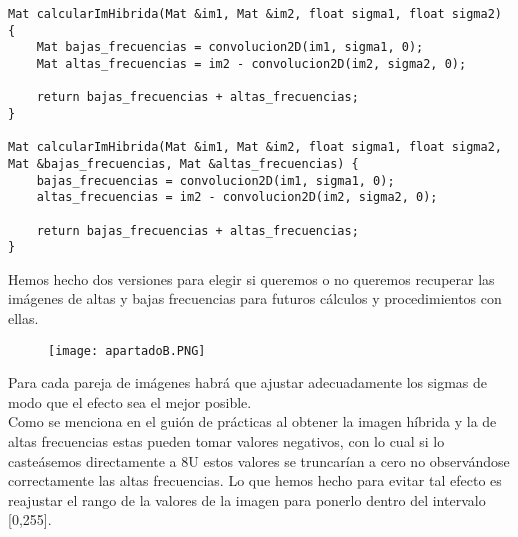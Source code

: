 \documentclass[10pt,a4paper]{article}
\begin{document}
\begin{lstlisting}
Mat calcularImHibrida(Mat &im1, Mat &im2, float sigma1, float sigma2) {
	Mat bajas_frecuencias = convolucion2D(im1, sigma1, 0);
	Mat altas_frecuencias = im2 - convolucion2D(im2, sigma2, 0);

	return bajas_frecuencias + altas_frecuencias;
}

Mat calcularImHibrida(Mat &im1, Mat &im2, float sigma1, float sigma2, Mat &bajas_frecuencias, Mat &altas_frecuencias) {
	bajas_frecuencias = convolucion2D(im1, sigma1, 0);
	altas_frecuencias = im2 - convolucion2D(im2, sigma2, 0);

	return bajas_frecuencias + altas_frecuencias;
}
\end{lstlisting}

Hemos hecho dos versiones para elegir si queremos o no queremos recuperar las imágenes de altas y bajas frecuencias para futuros cálculos y procedimientos con ellas.\\

\begin{figure}[H]
\centering
\texttt{[image: apartadoB.PNG]}
\end{figure}

Para cada pareja de imágenes habrá que ajustar adecuadamente los sigmas de modo que el efecto sea el mejor posible.\\

Como se menciona en el guión de prácticas al obtener la imagen híbrida y la de altas frecuencias estas pueden tomar valores negativos, con lo cual si lo casteásemos directamente a 8U estos valores se truncarían a cero no observándose correctamente las altas frecuencias. Lo que hemos hecho para evitar tal efecto es reajustar el rango de la valores de la imagen para ponerlo dentro del intervalo [0,255].\\
\end{document}
